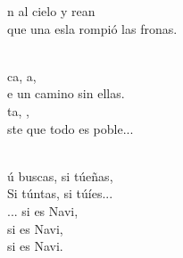 \documentclass[12pt]{article}
\begin{document}
\begin{multicols*}{2}
\begin{cancion}
	n al cielo y rean \\
	que una esla rompió las fronas. \\\jump\\
	\begin{chorus}%
	ca, a, \\
	e un camino sin ellas. \\
	ta, , \\
	ste que todo es poble... \\
	\end{chorus}%
	\jump\\
	ú buscas, si túeñas,  \\
	Si túntas, si túíes... \\
	... si es Navi,  \\
	si es Navi,  \\
	si es Navi.\\
\end{cancion}%

\end{multicols*}
\newpage
{}
\end{document}
